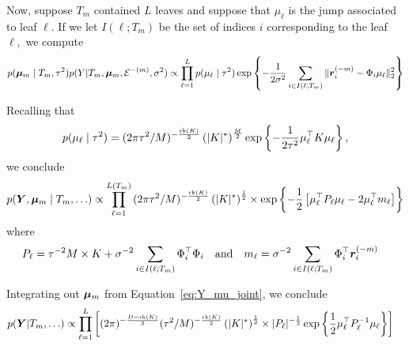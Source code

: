 Now, suppose $T_{m}$ contained $L$ leaves and suppose that $\mu_{\ell}$ is the jump associated to leaf $\ell.$
If we let $I(\ell;T_{m})$ be the set of indices $i$ corresponding to the leaf $\ell,$ we compute
\begin{equation}
p(\boldsymbol{\mu}_{m} \mid T_{m}, \tau^{2})p(Y \vert T_{m}, \boldsymbol{\mu}_{m}, \mathcal{E}^{-(m)}, \sigma^{2}) \propto \prod_{\ell = 1}^{L}{p(\mu_{\ell} \mid \tau^{2})\exp\left\{-\frac{1}{2\sigma^{2}}\sum_{i \in I(\ell;T_{m})}{\lVert \bm{r}_{i}^{(-m)} - \Phi_{i}\mu_{\ell}\rVert_{2}^{2}}\right\}}
\end{equation}

Recalling that
$$
p(\mu_{\ell} \mid \tau^{2}) = (2\pi\tau^{2}/M)^{-\frac{\text{rk}(K)}{2}}\left(\lvert K\rvert^{*}\right)^{\frac{M}{2}}\exp\left\{-\frac{1}{2\tau^{2}}\mu_{\ell}^{\top}K\mu_{\ell}\right\},
$$
we conclude
\begin{equation}
\label{eq:Y_mu_joint}
p(\bm{Y}, \boldsymbol{\mu}_{m} \mid T_{m}, \ldots) \propto \prod_{\ell = 1}^{L(T_{m})}{(2\pi\tau^{2}/M)^{-\frac{\text{rk}(K)}{2}}\left(\lvert K \rvert^{*}\right)^{\frac{1}{2}} \times \exp\left\{-\frac{1}{2}\left[\mu_{\ell}^{\top}P_{\ell}\mu_{\ell} - 2\mu_{\ell}^{\top}m_{\ell}\right]\right\}}
\end{equation}
where
\begin{align}
\label{eq:mu_post_params}
P_{\ell} &= \tau^{-2}M \times K + \sigma^{-2}\sum_{i \in I(\ell;T_{m})}{\Phi_{i}^{\top}\Phi_{i}} &\text{and} & &  m_{\ell} &= \sigma^{-2}\sum_{i \in I(\ell;T_{m})}{\Phi_{i}^{\top}\bm{r}_{i}^{(-m)}}
\end{align}

Integrating out $\boldsymbol{\mu}_{m}$ from Equation~\eqref{eq:Y_mu_joint}, we conclude
\begin{align}
\label{eq:tree_likelihood}
p(\bm{Y} \vert T_{m}, \ldots) &\propto \prod_{\ell = 1}^{L}{\left[(2\pi)^{-\frac{D - \text{rk}(K)}{2}}(\tau^{2}/M)^{-\frac{\text{rk}(K)}{2}}\left(\lvert K \rvert^{*}\right)^{\frac{1}{2}} \times \lvert P_{\ell} \rvert^{-\frac{1}{2}}\exp\left\{\frac{1}{2}\mu_{\ell}^{\top}P_{\ell}^{-1}\mu_{\ell}\right\}\right]}
\end{align}

